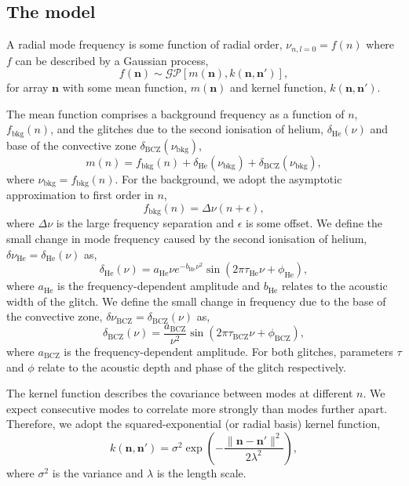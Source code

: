 \documentclass[linenumbers,modern,astrosymb,times]{aastex631dm}
\newcommand{\helium}{\mathrm{He}}
\newcommand{\bcz}{\mathrm{BCZ}}
\newcommand{\bkg}{\mathrm{bkg}}
\begin{document}
\subsection{The model}\label{sec:model}

A radial mode frequency is some function of radial order,
\(\nu_{n,l=0} = f(n)\) where \(f\) can be described by a Gaussian process,
%
\begin{equation}
    f(\bm n) \sim \mathcal{GP}\left[m(\bm n), k(\bm n, \bm n')\right],
\end{equation}
%
for array \(\bm n\) with some mean function, \(m(\bm n)\) and kernel function,
\(k(\bm n, \bm n')\).

The mean function comprises a background frequency as a function of \(n\),
\(f_\bkg(n)\), and the glitches due to the second ionisation of helium,
\(\delta_\helium(\nu)\) and base of the convective zone
\(\delta_\bcz(\nu_\bkg)\),
%
\begin{equation}
    m(n) = f_\bkg(n) + \delta_\helium(\nu_\bkg) +
    \delta_\bcz(\nu_\bkg),
\end{equation}
%
where \(\nu_\bkg = f_\bkg(n)\). For the background, we adopt the
asymptotic approximation to first order in \(n\),
%
\begin{equation}
    f_\bkg(n) = \Delta\nu (n + \epsilon),
\end{equation}
%
where \(\Delta\nu\) is the large frequency separation and \(\epsilon\) is some
offset. We define the small change in mode frequency caused by the second
ionisation of helium, \(\delta\nu_\helium = \delta_\helium(\nu)\) as,
%
\begin{equation}
    \delta_\helium(\nu) = a_\helium \nu e^{- b_\helium \nu^2}
    \sin\left( 2 \pi \tau_\helium \nu + \phi_\helium \right),
\end{equation}
%
where \(a_\helium\) is the frequency-dependent amplitude and \(b_\helium\)
relates to the acoustic width of the glitch. We define the small change in
frequency due to the base of the convective zone,
\(\delta\nu_\bcz = \delta_\bcz(\nu)\) as,
%
\begin{equation}
    \delta_\bcz(\nu) = \frac{a_\bcz}{\nu^2}
    \sin\left( 2 \pi \tau_\bcz \nu + \phi_\bcz \right),
\end{equation}
%
where \(a_\bcz\) is the frequency-dependent amplitude. For both glitches,
parameters \(\tau\) and \(\phi\) relate to the acoustic depth and phase of
the glitch respectively.

The kernel function describes the covariance between modes at different \(n\).
We expect consecutive modes to correlate more strongly than modes further
apart. Therefore, we adopt the squared-exponential (or radial basis) kernel
function,
%
\begin{equation}
    k(\bm n, \bm n') = \sigma^2
    \exp\left(- \frac{\| \bm n - \bm n' \|^2}{2\lambda^2}\right),
\end{equation}
%
where \(\sigma^2\) is the variance and \(\lambda\) is the length scale.
\end{document}

